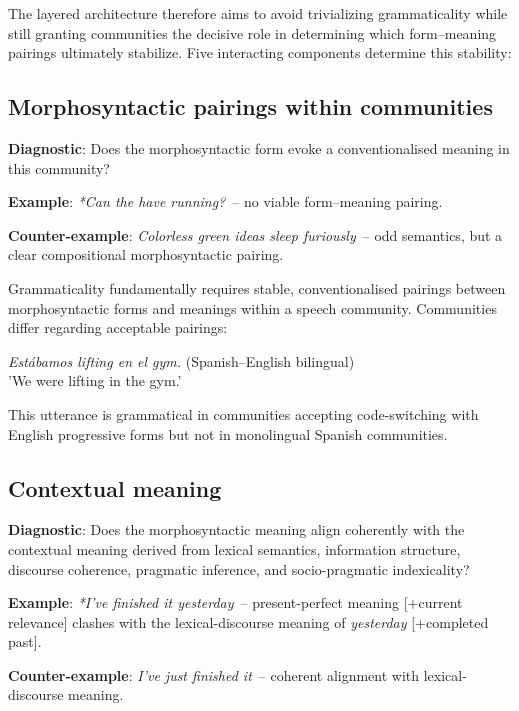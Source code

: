 \documentclass[12pt]{article}
\begin{document}
The layered architecture therefore aims to avoid trivializing grammaticality while still granting communities the decisive role in determining which form–meaning pairings ultimately stabilize. Five interacting components determine this stability:

\subsection{Morphosyntactic pairings within communities}

\begin{tcolorbox}[colback=lsLightBlue!30]
\textbf{Diagnostic}: Does the morphosyntactic form evoke a conventionalised meaning in this community?

\textbf{Example}: \textit{*Can the have running?}~-- no viable form–meaning pairing.

\textbf{Counter-example}: \textit{Colorless green ideas sleep furiously}~-- odd semantics, but a clear compositional morphosyntactic pairing.
\end{tcolorbox}

Grammaticality fundamentally requires stable, conventionalised pairings between morphosyntactic forms and meanings within a speech community. Communities differ regarding acceptable pairings:

\ea
\textit{Estábamos lifting en el gym.} (Spanish–English bilingual)\\
'We were lifting in the gym.'
\z

This utterance is grammatical in communities accepting code-switching with English progressive forms but not in monolingual Spanish communities.

\subsection{Contextual meaning}

\begin{tcolorbox}[colback=lsLightBlue!30]
\textbf{Diagnostic}: Does the morphosyntactic meaning align coherently with the contextual meaning derived from lexical semantics, information structure, discourse coherence, pragmatic inference, and socio-pragmatic indexicality?

\textbf{Example}: \textit{*I've finished it yesterday}~-- present-perfect meaning [+current relevance] clashes with the lexical-discourse meaning of \textit{yesterday} [+completed past].

\textbf{Counter-example}: \textit{I've just finished it}~-- coherent alignment with lexical-discourse meaning.
\end{tcolorbox}
\end{document}
